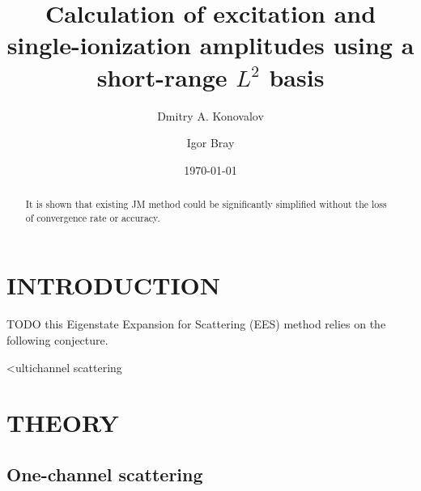 \documentclass[aip
, pra
, showpacs
, aps
, twocolumn
, groupedaddress
, floatfix
]{revtex4}
\begin{document}
\title {Calculation of excitation and single-ionization amplitudes using a short-range $L^2$ basis}

\author{Dmitry A. Konovalov}

\author{Igor Bray}


\date{\today}

\begin{abstract}
It is shown that existing JM method could be significantly simplified without the loss of convergence rate or accuracy.

\end{abstract}

\maketitle

\section{INTRODUCTION}
TODO
this Eigenstate Expansion for Scattering (EES) method relies on the following conjecture.

<ultichannel scattering \cite{CA73, NO72, TF79, Nesbet78, Lucchese86} 

\section{THEORY}
\subsection{One-channel scattering}
\end{document}
